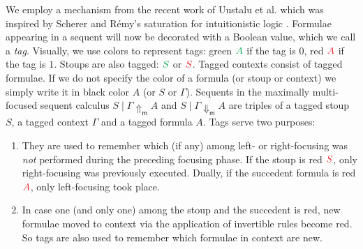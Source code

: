 \documentclass[runningheads]{llncs}
\newcommand{\red}[1]{{\color{Red}#1}}
\newcommand{\green}[1]{{\color{Green}#1}}
\newcommand{\upm}{\Uparrow_{\mathsf{m}}}
\newcommand{\dnm}{\Downarrow_{\mathsf{m}}}
\begin{document}
We employ a mechanism from the recent work of Uustalu et al. \cite{UVW:protsn} which was inspired by Scherer and R{\'e}my's saturation for intuitionistic logic \cite{scherer:simple:2015}. Formulae appearing in a sequent will now be decorated with a Boolean value, which we call a \emph{tag}. Visually, we use colors to represent tags: green $\green{A}$ if the tag is $0$, red $\red{A}$ if the tag is $1$.
Stoups are also tagged: $\green{S}$ or $\red{S}$. Tagged contexts consist of tagged formulae. If we do not specify the color of a formula (or stoup or context) we simply write it in black color $A$ (or $S$ or $\Gamma$). Sequents in the maximally multi-focused sequent calculus $S \mid \Gamma \upm A$ and $S \mid \Gamma \dnm A$ are triples of a tagged stoup $S$, a tagged context $\Gamma$ and a tagged formula $A$. Tags serve two purposes:
\begin{enumerate}
\item They are used to remember which (if any) among left- or right-focusing was \emph{not} performed during the preceding focusing phase. If the stoup is red $\red{S}$, only right-focusing was previously executed. Dually, if the succedent formula is red $\red{A}$, only left-focusing took place. \item In case one (and only one) among the stoup and the succedent is red, new formulae moved to context via the application of invertible rules become red. So tags are also used to remember which formulae in context are new.
\end{enumerate}
\end{document}
